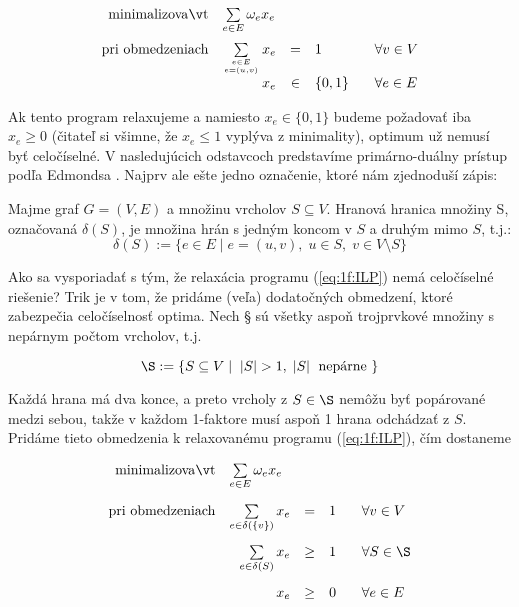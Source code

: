 \begin{equation}
  \label{eq:1f:ILP}
\begin{array}{rrcll}
  {\rm minimalizovať}     & \multicolumn{1}{l}{\sum\limits_{e\in E}\omega_ex_e}\\[3ex]
  {\rm pri\ obmedzeniach} &  \sum\limits_{e\in E\atop e=(u,v)} x_e &=&1& \;\;\;\forall v\in V\\
                          & x_e&\in&\{0,1\}& \;\;\;\forall e\in E\\
\end{array}
\end{equation}

\noindent
Ak tento program relaxujeme a namiesto $x_e\in\{0,1\}$ budeme požadovať iba $x_e\ge0$ 
(čitateľ si všimne, že $x_e\le1$ vyplýva z minimality), optimum už nemusí byť celočíselné. 
V nasledujúcich odstavcoch predstavíme primárno-duálny prístup podľa Edmondsa \cite{Edmonds65}.
Najprv ale ešte jedno označenie, ktoré nám zjednoduší zápis:

\begin{dfn}
  \label{dfn:edgeboundary}
Majme graf $G=(V,E)$ a množinu vrcholov $S\subseteq V$. Hranová hranica množiny S, označovaná $\delta(S)$, je množina hrán 
s jedným koncom v $S$ a druhým mimo $S$, t.j.:
$$\delta(S):=\{e\in E\mid e=(u,v),\;u\in S,\;v\in V\setminus S\}$$
\end{dfn}

\noindent
Ako sa vysporiadať s tým, že relaxácia programu (\ref{eq:1f:ILP}) nemá celočíselné riešenie? Trik je v tom,
že pridáme (veľa) dodatočných obmedzení, ktoré zabezpečia celočíselnosť optima. Nech \S
sú všetky aspoň trojprvkové 
množiny s nepárnym počtom vrcholov, t.j.

$$\S:=\left\{ S\subseteq V\mid\; |S|>1,\;|S|\;\text{\ nepárne\ }\right\}$$

\noindent
Každá hrana má dva konce, a preto vrcholy z $S\in\S$ nemôžu byť popárované medzi sebou, takže
v každom 1-faktore musí aspoň 1 hrana odchádzať z $S$. Pridáme tieto obmedzenia k relaxovanému programu
(\ref{eq:1f:ILP}),
čím dostaneme

\begin{equation}
  \label{eq:1f:P}
\begin{array}{rrcll}
  {\rm minimalizovať}     & \multicolumn{1}{l}{\sum\limits_{e\in E}\omega_ex_e}\\[4ex]
  {\rm pri\ obmedzeniach} &  \sum\limits_{e\in\delta(\{v\})} x_e &=&1& \;\;\;\forall v\in V\\[4ex]
                          & \sum\limits_{e\in\delta(S)}x_e&\ge&1&\;\;\;\forall S\in\S\\[4ex]
                          & x_e&\ge&0& \;\;\;\forall e\in E\\
\end{array}
\end{equation}

